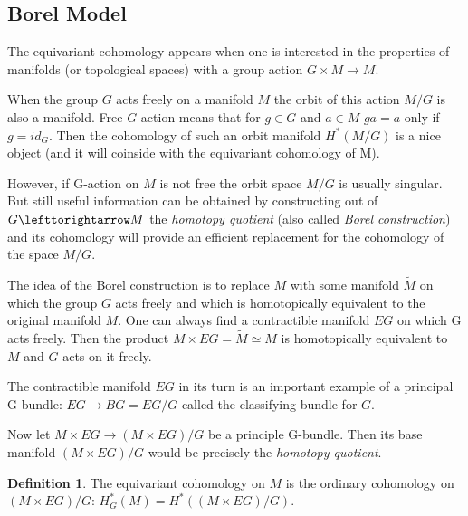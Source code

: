 \documentclass[11pt]{report}
\def\acts{\lefttorightarrow}
\theoremstyle{plain}
\theoremstyle{definition}
\newtheorem{defn}[thm]{Definition}
\theoremstyle{remark}
\theoremstyle{remark}
\numberwithin{equation}{section}
\begin{document}
\subsection{Borel Model}

The equivariant cohomology appears when one is interested in the properties of manifolds (or topological spaces) with a group action $G\times M\to M$. 

When the group $G$ acts freely on a manifold $M$ the orbit of this action $M/G$ is also a manifold. Free $G$ action means that for $g\in G$  and $a\in M$ $ga = a$ only if $g=id_G$. Then the cohomology of such an orbit manifold $H^*(M/G)$ is a nice object (and it will coinside with the equivariant cohomology of M). 

However, if G-action on $M$ is not free the orbit space $M/G$ is usually singular. But still useful information can be obtained by constructing out of  $G\acts M$ the \textit{homotopy quotient} (also called \textit{Borel construction}) and its cohomology will provide an efficient replacement for the cohomology of the space $M/G$. 

The idea of the Borel construction is to replace $M$ with some manifold $\tilde{M}$ on which the group $G$ acts freely and which is homotopically equivalent to the original manifold $M$. 
One can always find a contractible manifold $EG$ on which G acts freely. Then the product $M\times EG=\tilde{M} \simeq M$ is homotopically equivalent to $M$ and $G$ acts on it freely.

The contractible manifold $EG$ in its turn is an important example of a principal G-bundle: $EG\to BG=EG/G$ called the classifying bundle for $G$. 


Now let $M \times EG \to (M \times EG)/G$ be a principle G-bundle. Then its base manifold $(M \times EG)/G$ would be precisely  the \textit{homotopy quotient}. 

 \begin{defn}
The equivariant cohomology on $M$ is the ordinary cohomology on $(M\times EG)/G$:
$H^*_G(M) = H^*((M\times EG)/G)$.
\end{defn}
\end{document}
